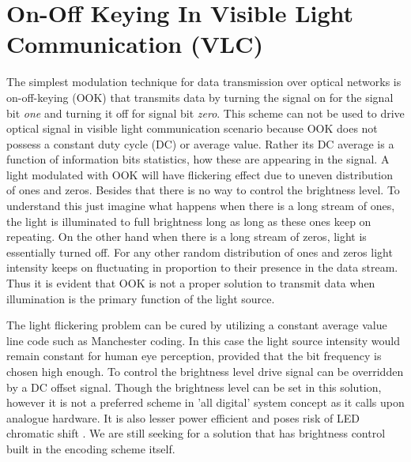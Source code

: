 \section{On-Off Keying In Visible Light Communication (VLC)}
The simplest modulation technique for data transmission over optical networks is on-off-keying (OOK) that transmits data by turning the signal on for the signal bit \emph{one} and turning it off for signal bit \emph{zero}. This scheme can not be used to drive optical signal in visible light communication scenario because OOK does not possess a constant duty cycle (DC) or average value. Rather its DC average is a function of information bits statistics, how these are appearing in the signal. A light modulated with OOK will have flickering effect due to uneven distribution of ones and zeros. Besides that there is no way to control the brightness level. To understand this just imagine what happens when there is a long stream of ones, the light is illuminated to full brightness long as long as these ones keep on repeating. On the other hand when there is a long stream of zeros, light is essentially turned off. For any other random distribution of ones and zeros light intensity keeps on fluctuating in proportion to their presence in the data stream. Thus it is evident that OOK is not a proper solution to transmit data when illumination is the primary function of the light source.

The light flickering problem can be cured by utilizing a constant average value line code such as  Manchester coding. In this case the light source intensity would remain constant for human eye perception, provided that the bit frequency is chosen high enough. To control the brightness level drive signal can be overridden by a DC offset signal. Though the brightness level can be set in this solution, however it is not a preferred scheme in 'all digital' system concept as it calls upon analogue hardware. It is also lesser power efficient and poses risk of LED chromatic shift \cite{dyble2005impact} \cite{levada2006high}. We are still seeking for a solution that has brightness control built in the encoding scheme itself.

